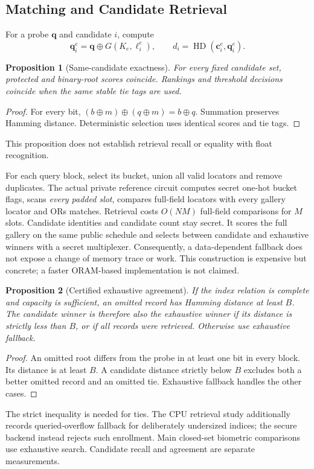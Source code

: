 \documentclass[journal]{IEEEtran}
\newcommand{\HD}{\operatorname{HD}}
\newtheorem{proposition}{Proposition}
\begin{document}
\subsection{Matching and Candidate Retrieval}
For a probe $\mathbf q$ and candidate $i$, compute
\begin{equation}
\mathbf q_i^e=\mathbf q\oplus G(K_e,\ell_i^e),\qquad
d_i=\HD(\mathbf c_i^e,\mathbf q_i^e).
\end{equation}
\begin{proposition}[Same-candidate exactness]
For every fixed candidate set, protected and binary-root scores coincide. Rankings and threshold decisions coincide when the same stable tie tags are used.
\end{proposition}
\begin{proof}
For every bit, $(b\oplus m)\oplus(q\oplus m)=b\oplus q$. Summation preserves Hamming distance. Deterministic selection uses identical scores and tie tags.
\end{proof}
This proposition does not establish retrieval recall or equality with float recognition.

For each query block, select its bucket, union all valid locators and remove duplicates. The actual private reference circuit computes secret one-hot bucket flags, scans \emph{every padded slot}, compares full-field locators with every gallery locator and ORs matches. Retrieval costs $O(NM)$ full-field comparisons for $M$ slots. Candidate identities and candidate count stay secret. It scores the full gallery on the same public schedule and selects between candidate and exhaustive winners with a secret multiplexer. Consequently, a data-dependent fallback does not expose a change of memory trace or work. This construction is expensive but concrete; a faster ORAM-based implementation is not claimed.

\begin{proposition}[Certified exhaustive agreement]
If the index relation is complete and capacity is sufficient, an omitted record has Hamming distance at least $B$. The candidate winner is therefore also the exhaustive winner if its distance is strictly less than $B$, or if all records were retrieved. Otherwise use exhaustive fallback.
\end{proposition}
\begin{proof}
An omitted root differs from the probe in at least one bit in every block. Its distance is at least $B$. A candidate distance strictly below $B$ excludes both a better omitted record and an omitted tie. Exhaustive fallback handles the other cases.
\end{proof}
The strict inequality is needed for ties. The CPU retrieval study additionally records queried-overflow fallback for deliberately undersized indices; the secure backend instead rejects such enrollment. Main closed-set biometric comparisons use exhaustive search. Candidate recall and agreement are separate measurements.
\end{document}

